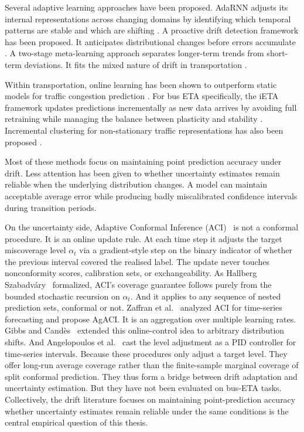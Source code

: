 \documentclass[12pt, a4paper, oneside]{report}
\begin{document}
Several adaptive learning approaches have been proposed. AdaRNN adjusts its internal representations across changing domains by identifying which temporal patterns are stable and which are shifting \cite{Du2021402}. A proactive drift detection framework has been proposed. It anticipates distributional changes before errors accumulate \cite{Zhao20252020}. A two-stage meta-learning approach separates longer-term trends from short-term deviations. It fits the mixed nature of drift in transportation \cite{Chen20254869}.

Within transportation, online learning has been shown to outperform static models for traffic congestion prediction \cite{Manibardo2020}. For bus ETA specifically, the iETA framework updates predictions incrementally as new data arrives by avoiding full retraining while managing the balance between plasticity and stability \cite{Han20234100}. Incremental clustering for non-stationary traffic representations has also been proposed \cite{Tsai20223237}.

Most of these methods focus on maintaining point prediction accuracy under drift. Less attention has been given to whether uncertainty estimates remain reliable when the underlying distribution changes. A model can maintain acceptable average error while producing badly miscalibrated confidence intervals during transition periods.

On the uncertainty side, Adaptive Conformal Inference (ACI)~\cite{Gibbs2021} is not a conformal procedure. It is an online update rule. At each time step it adjusts the target miscoverage level $\alpha_t$ via a gradient-style step on the binary indicator of whether the previous interval covered the realised label. The update never touches nonconformity scores, calibration sets, or exchangeability. As Hallberg Szabadv\'ary~\cite{HallbergSzabadvary2024} formalized, ACI's coverage
guarantee follows purely from the bounded stochastic recursion on $\alpha_t$. And it applies to any sequence of nested prediction sets, conformal or not. Zaffran et al.~\cite{Zaffran202225834} analyzed ACI for time-series forecasting and propose AgACI. It is an aggregation over multiple learning rates. Gibbs and Cand\`es~\cite{Gibbs2024} extended this online-control idea to arbitrary distribution shifts. And Angelopoulos et al.~\cite{Angelopoulos2023} cast the level adjustment as a PID controller for time-series intervals. Because these procedures only adjust a target level. They offer long-run average coverage rather than the finite-sample marginal coverage of split conformal prediction. They thus form a bridge between drift adaptation and uncertainty estimation. But they have not been evaluated on bus-ETA tasks. Collectively, the drift literature focuses on maintaining point-prediction accuracy whether uncertainty estimates remain reliable under the same conditions is the central empirical question of this thesis.
\end{document}
